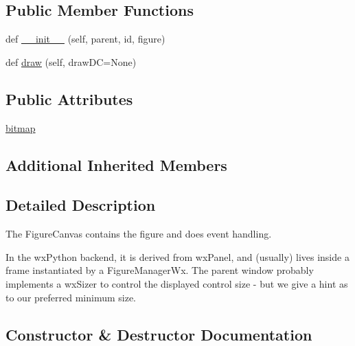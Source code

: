 \subsection*{Public Member Functions}
\begin{DoxyCompactItemize}
\item 
def \hyperlink{classmatplotlib_1_1backends_1_1backend__wxcairo_1_1FigureCanvasWxCairo_ad0c3d21f3d2ba4323d9135258f88d2de}{\+\_\+\+\_\+init\+\_\+\+\_\+} (self, parent, id, figure)
\item 
def \hyperlink{classmatplotlib_1_1backends_1_1backend__wxcairo_1_1FigureCanvasWxCairo_ac0979f1803d81936d6fcdf1ddff6b909}{draw} (self, draw\+DC=None)
\end{DoxyCompactItemize}
\subsection*{Public Attributes}
\begin{DoxyCompactItemize}
\item 
\hyperlink{classmatplotlib_1_1backends_1_1backend__wxcairo_1_1FigureCanvasWxCairo_ab7654908f2618c823dd89075d1ff84d2}{bitmap}
\end{DoxyCompactItemize}
\subsection*{Additional Inherited Members}


\subsection{Detailed Description}
\begin{DoxyVerb}The FigureCanvas contains the figure and does event handling.

In the wxPython backend, it is derived from wxPanel, and (usually) lives
inside a frame instantiated by a FigureManagerWx. The parent window
probably implements a wxSizer to control the displayed control size - but
we give a hint as to our preferred minimum size.
\end{DoxyVerb}
 

\subsection{Constructor \& Destructor Documentation}
\mbox{\label{classmatplotlib_1_1backends_1_1backend__wxcairo_1_1FigureCanvasWxCairo_ad0c3d21f3d2ba4323d9135258f88d2de}} 
